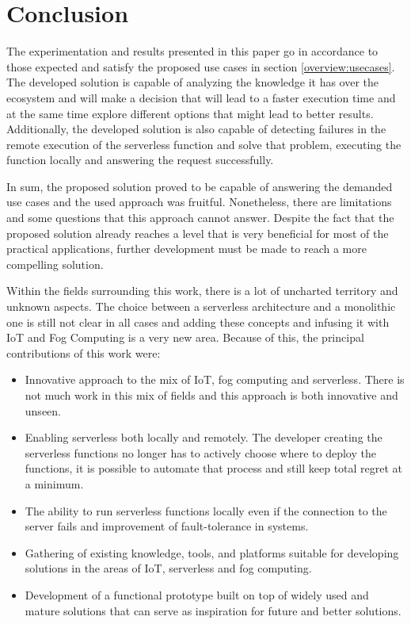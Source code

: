 \section{Conclusion}
The experimentation and results presented in this paper go in accordance to
those expected and satisfy the proposed use cases in section \ref{overview:usecases}. The
developed solution is capable of analyzing the knowledge it has over the ecosystem
and will make a decision that will lead to a faster execution time and at the
same time explore different options that might lead to better results.
Additionally, the developed solution is also capable of detecting failures in the
remote execution of the serverless function and solve that problem, executing the
function locally and answering the request successfully.

In sum, the proposed solution proved to be capable of answering the demanded use
cases and the used approach was fruitful. Nonetheless, there are limitations and
some questions that this approach cannot answer.
Despite the fact that the proposed solution already reaches a level that is very
beneficial for most of the practical applications, further development must be
made to reach a more compelling solution.

Within the fields surrounding this work, there is a lot of uncharted
territory and unknown aspects. The choice between a serverless architecture and a
monolithic one is still not clear in all cases and adding these concepts and
infusing it with IoT and Fog Computing is a very new area. Because of this, the
principal contributions of this work were:

\begin{itemize}
    \item Innovative approach to the mix of IoT, fog computing and serverless. There is not much work in this mix of fields and this approach is both innovative
        and unseen.

    \item Enabling serverless both locally and remotely. The developer creating the serverless functions no longer has to actively choose where to deploy the functions, it is possible to automate that process and still keep total
        regret at a minimum.

    \item The ability to run serverless functions locally even if the connection to the server fails and improvement of fault-tolerance in systems.

    \item Gathering of existing knowledge, tools, and platforms suitable for developing solutions in the areas of IoT, serverless and fog computing.

    \item Development of a functional prototype built on top of widely used and mature solutions that can serve as inspiration for future and better solutions.
\end{itemize}

